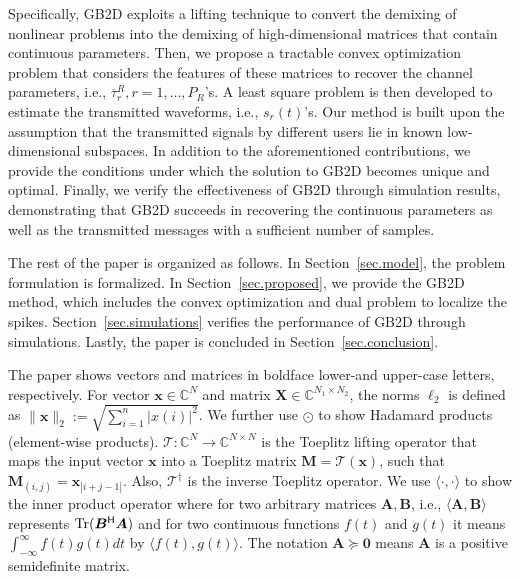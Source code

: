\documentclass[conference,10pt]{IEEEtran}
\theoremstyle{remark}
\theoremstyle{plain}
\theoremstyle{definition}
\theoremstyle{remark}
\begin{document}
Specifically,  GB2D exploits a lifting technique to convert the demixing of nonlinear problems into the demixing of high-dimensional matrices that contain continuous parameters. Then, we propose a tractable convex optimization problem that considers the features of these matrices to recover the channel parameters, i.e., $\overline{\tau}_r^R, r=1,\ldots, P_R$'s. A least square problem is then developed to estimate the transmitted waveforms, i.e., $s_r(t)$'s.  Our method is built upon the assumption that the transmitted signals by different users lie in known low-dimensional subspaces.   In addition to the aforementioned contributions, we provide the conditions under which the solution to GB2D becomes unique and optimal. Finally, we verify the effectiveness of GB2D through simulation results, demonstrating that GB2D succeeds in recovering the continuous parameters as well as the transmitted messages with a sufficient number of samples.



The rest of the paper is organized as follows.  In Section~\ref{sec.model}, the problem formulation is formalized. In Section~\ref{sec.proposed}, we provide the GB2D method, which includes the convex optimization and dual problem to localize the spikes. Section~\ref{sec.simulations} verifies the performance of GB2D through simulations. Lastly, the paper is concluded in Section~\ref{sec.conclusion}.


The paper shows vectors and matrices in boldface lower-and upper-case letters, respectively.  For vector $\bm{x}\in\mathbb{C}^N$ and matrix $\bm{X}\in\mathbb{C}^{N_1\times N_2}$, the norms $\ell_2$ is defined as $\|\bm{x}\|_2:= \sqrt{\sum_{i=1}^n|x(i)|^2}$. 
We further use $\odot$ to show Hadamard products (element-wise products). $\mathscr{T} : \mathbb{C}^N \to \mathbb{C}^{N\times N}$ is the Toeplitz lifting operator that maps the input vector $\bm{x}$  into  a Toeplitz matrix $\bm{M}=\mathscr{T}(\bm{x})$, such that $\bm{M}_{(i,j)} = \bm{x}_{|i+j-1|}$. Also, $\mathscr{T}^{\dagger}$ is the inverse Toeplitz operator. We use $\langle \cdot, \cdot \rangle$ to show the inner product operator where  
for two arbitrary matrices $\bm{A}, \bm{B}$, i.e., $\langle \bm{A}, \bm{B}\rangle$ represents ${\rm Tr} (\bm{B}^{\mathsf  H}\bm{A})$ and for two continuous functions $f(t)$ and $g(t)$ it means $\int_{-\infty}^{\infty}f(t)g(t)dt$ by $\langle f(t), g(t) \rangle$. The notation $\bm{A}\succeq \bm{0}$ means $\bm{A}$ is a positive semidefinite matrix.
\end{document}
